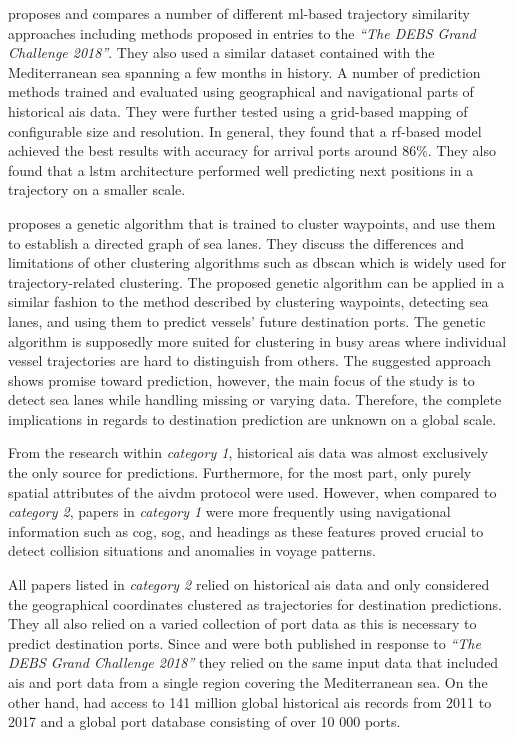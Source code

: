 \cite{Karatas2020TrajectoryData} proposes and compares a number of different \acrshort{ml}-based trajectory similarity approaches including methods proposed in entries to the \textit{``The DEBS Grand Challenge 2018''}. They also used a similar dataset contained with the Mediterranean sea spanning a few months in history. A number of prediction methods trained and evaluated using geographical and navigational parts of historical \acrshort{ais} data. They were further tested using a grid-based mapping of configurable size and resolution. In general, they found that a \acrshort{rf}-based model achieved the best results with accuracy for arrival ports around 86\%. They also found that a \acrfull{lstm} architecture performed well predicting next positions in a trajectory on a smaller scale.

\cite{Dobrkovic2018MaritimeData} proposes a genetic algorithm that is trained to cluster waypoints, and use them to establish a directed graph of sea lanes. They discuss the differences and limitations of other clustering algorithms such as \acrshort{dbscan} which is widely used for trajectory-related clustering. The proposed genetic algorithm can be applied in a similar fashion to the method described \cite{pallotta} by clustering waypoints, detecting sea lanes, and using them to predict vessels' future destination ports. The genetic algorithm is supposedly more suited for clustering in busy areas where individual vessel trajectories are hard to distinguish from others. The suggested approach shows promise toward prediction, however, the main focus of the study is to detect sea lanes while handling missing or varying data. Therefore, the complete implications in regards to destination prediction are unknown on a global scale.


From the research within \textit{category 1}, historical \acrshort{ais} data was almost exclusively the only source for predictions. Furthermore, for the most part, only purely spatial attributes of the \gls{aivdm} protocol were used. However, when compared to \textit{category 2}, papers in \textit{category 1} were more frequently using navigational information such as \acrshort{cog}, \acrshort{sog}, and headings as these features proved crucial to detect collision situations and anomalies in voyage patterns.

All papers listed in \textit{category 2} relied on historical \acrshort{ais} data and only considered the geographical coordinates clustered as trajectories for destination predictions. They all also relied on a varied collection of port data as this is necessary to predict destination ports. Since \cite{Rosca2018GrandRoutes} and \cite{Bachar2018GrandDestination} were both published in response to \textit{``The DEBS Grand Challenge 2018''} they relied on the same input data that included \acrshort{ais} and port data from a single region covering the Mediterranean sea. On the other hand, \cite{Zhang2020AISApproach} had access to 141 million global historical \acrshort{ais} records from 2011 to 2017 and a global port database consisting of over 10 000 ports.

